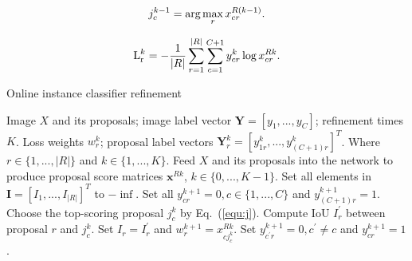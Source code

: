 \documentclass[10pt,twocolumn,letterpaper]{article}
\begin{document}
\begin{equation}
\label{equ:j}
   j^{k-1}_{c} = \textup{arg}\max_{r} x^{R(k-1)}_{cr}.
\end{equation}

\begin{equation}
\label{equ:loss_refine}
   \textup{L}^{k}_\textup{r} = -\frac{1}{|R|}\mathop{\sum} \limits_{r=1}^{|R|} \sum_{c=1}^{C+1} y^{k}_{cr} \log x^{Rk}_{cr}.
\end{equation}


\begin{algorithm}[t]
\caption{Online instance classifier refinement}
\label{alg:oicr}
\begin{algorithmic}[1]
   \REQUIRE Image $X$ and its proposals; image label vector $\mathbf{Y} = [y_{1}, ..., y_{C}]$; refinement times $K$.
   \ENSURE Loss weights $w^{k}_{r}$; proposal label vectors $\mathbf{Y}^{k}_{r} = [y^{k}_{1r}, ..., y^{k}_{(C+1)r}]^{T}$. Where $r \in \{1, ..., |R|\}$ and $k \in \{1, ..., K\}$.
   \STATE Feed $X$ and its proposals into the network to produce proposal score matrices  $\mathbf{x}^{Rk}$, $k \in \{0, ..., K-1\}$.
   \STATE Set all elements in $\mathbf{I} = [I_{1}, ..., I_{|R|}]^{T}$ to $-\inf$.
   \STATE Set all $y^{k+1}_{cr}=0, c \in \{1, ..., C\}$ and $y^{k+1}_{(C+1)r}=1$.
            \STATE  Choose the top-scoring proposal $j^{k}_{c}$ by Eq.~(\ref{equ:j}).
               \STATE Compute IoU $I^{\prime}_{r}$ between proposal $r$ and $j^{k}_{c}$.
                  \STATE Set $I_{r} = I^{\prime}_{r}$ and $w^{k+1}_{r} = x^{Rk}_{cj^{k}_{c}}$.
                     \STATE Set $y^{k+1}_{c^{\prime}r}=0, c^{\prime} \ne c$ and $y^{k+1}_{cr} = 1$.
                  \ENDIF
               \ENDIF
            \ENDFOR
         \ENDIF
      \ENDFOR
   \ENDFOR
\end{algorithmic}
\end{algorithm}
\end{document}
